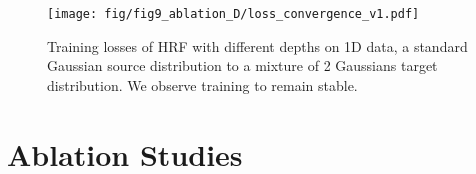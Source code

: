 \begin{table}[t]
\centering
{}
\caption{HRF2 performance for low dimensional experiments under the same $\text{NFE}=100$ budget with different choices of sampling steps. Sampling steps $(J,L)$ indicates that we use $J$ steps to integrate $x$ and $L$ steps to integrate $v$. 1-WD refers to the 1-Wasserstein distance and 2-SWD refers to the Sliced 2-Wasserstein distance. \textbf{Bold} for the best. \underline{Underline} for the runner-up. }
\label{tab:ablation_nfe}
\end{table}

\begin{figure}[t]
    \centering
    \texttt{[image: fig/fig9\_ablation\_D/loss\_convergence\_v1.pdf]}
    \caption{Training losses of HRF with different depths on 1D data, a standard Gaussian source distribution to a mixture of 2 Gaussians target distribution. We observe training to remain stable.}
    \label{fig:loss_convergence}
\end{figure}


\section{Ablation Studies}
\label{sec:ablation}
